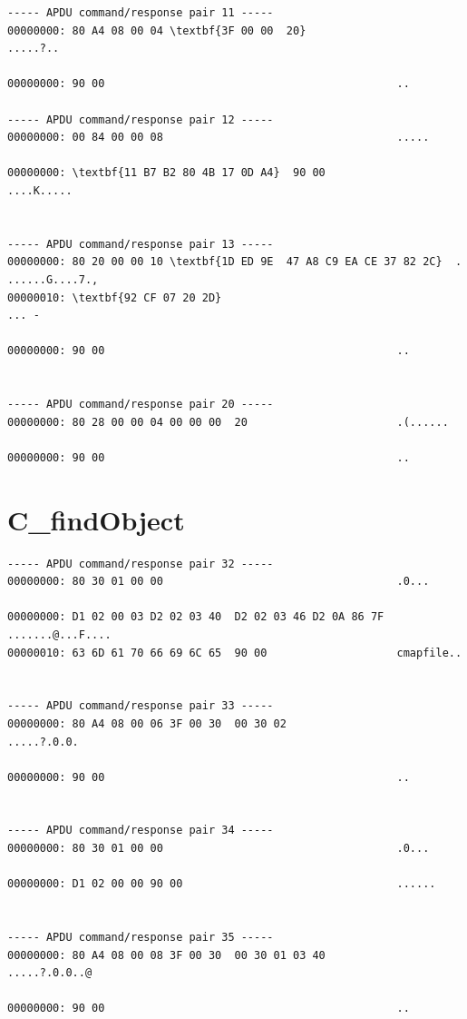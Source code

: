 \documentclass[bsc,frontabs,twoside,singlespacing,parskip,deptreport]{infthesis}     %
\begin{document}
\begin{appendices}
\begin{Verbatim}[commandchars=\\\{\}, fontsize=\small]
----- APDU command/response pair 11 -----
00000000: 80 A4 08 00 04 \textbf{3F 00 00  20}                       .....?.. 

00000000: 90 00                                             ..

----- APDU command/response pair 12 -----
00000000: 00 84 00 00 08                                    .....

00000000: \textbf{11 B7 B2 80 4B 17 0D A4}  90 00                    ....K.....


----- APDU command/response pair 13 -----
00000000: 80 20 00 00 10 \textbf{1D ED 9E  47 A8 C9 EA CE 37 82 2C}  . ......G....7.,
00000010: \textbf{92 CF 07 20 2D}                                    ... -

00000000: 90 00                                             ..


----- APDU command/response pair 20 -----
00000000: 80 28 00 00 04 00 00 00  20                       .(...... 

00000000: 90 00                                             ..

\end{Verbatim}

\section{C\_findObject}
\begin{Verbatim}[commandchars=\\\{\}, fontsize=\small]
----- APDU command/response pair 32 -----
00000000: 80 30 01 00 00                                    .0...

00000000: D1 02 00 03 D2 02 03 40  D2 02 03 46 D2 0A 86 7F  .......@...F....
00000010: 63 6D 61 70 66 69 6C 65  90 00                    cmapfile..


----- APDU command/response pair 33 -----
00000000: 80 A4 08 00 06 3F 00 30  00 30 02                 .....?.0.0.

00000000: 90 00                                             ..


----- APDU command/response pair 34 -----
00000000: 80 30 01 00 00                                    .0...

00000000: D1 02 00 00 90 00                                 ......


----- APDU command/response pair 35 -----
00000000: 80 A4 08 00 08 3F 00 30  00 30 01 03 40           .....?.0.0..@

00000000: 90 00                                             ..



\end{Verbatim}
\end{appendices}
\end{document}

